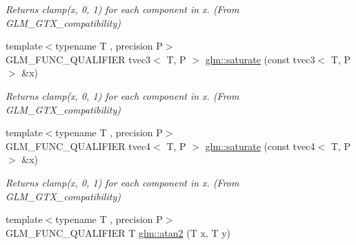\begin{DoxyCompactItemize}
\begin{DoxyCompactList}\small\item\em Returns clamp(x, 0, 1) for each component in x. (From G\-L\-M\-\_\-\-G\-T\-X\-\_\-compatibility) \end{DoxyCompactList}\item 
\hypertarget{group__gtx__compatibility_ga02ed1a53c6df104d56b69f8fb5e9af1b}{{\footnotesize template$<$typename T , precision P$>$ }\\G\-L\-M\-\_\-\-F\-U\-N\-C\-\_\-\-Q\-U\-A\-L\-I\-F\-I\-E\-R tvec3$<$ T, P $>$ \hyperlink{group__gtx__compatibility_ga02ed1a53c6df104d56b69f8fb5e9af1b}{glm\-::saturate} (const tvec3$<$ T, P $>$ \&x)}\label{group__gtx__compatibility_ga02ed1a53c6df104d56b69f8fb5e9af1b}

\begin{DoxyCompactList}\small\item\em Returns clamp(x, 0, 1) for each component in x. (From G\-L\-M\-\_\-\-G\-T\-X\-\_\-compatibility) \end{DoxyCompactList}\item 
\hypertarget{group__gtx__compatibility_ga63791409bdef9745b956406afe3157f1}{{\footnotesize template$<$typename T , precision P$>$ }\\G\-L\-M\-\_\-\-F\-U\-N\-C\-\_\-\-Q\-U\-A\-L\-I\-F\-I\-E\-R tvec4$<$ T, P $>$ \hyperlink{group__gtx__compatibility_ga63791409bdef9745b956406afe3157f1}{glm\-::saturate} (const tvec4$<$ T, P $>$ \&x)}\label{group__gtx__compatibility_ga63791409bdef9745b956406afe3157f1}

\begin{DoxyCompactList}\small\item\em Returns clamp(x, 0, 1) for each component in x. (From G\-L\-M\-\_\-\-G\-T\-X\-\_\-compatibility) \end{DoxyCompactList}\item 
\hypertarget{group__gtx__compatibility_gac63011205bf6d0be82589dc56dd26708}{{\footnotesize template$<$typename T , precision P$>$ }\\G\-L\-M\-\_\-\-F\-U\-N\-C\-\_\-\-Q\-U\-A\-L\-I\-F\-I\-E\-R T \hyperlink{group__gtx__compatibility_gac63011205bf6d0be82589dc56dd26708}{glm\-::atan2} (T x, T y)}\label{group__gtx__compatibility_gac63011205bf6d0be82589dc56dd26708}


\end{DoxyCompactItemize}
